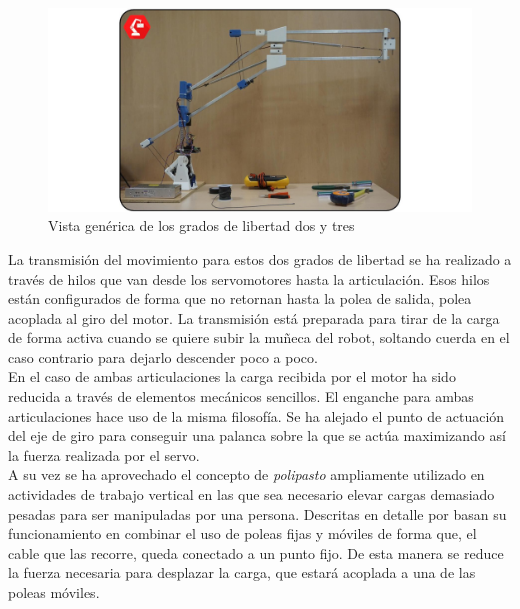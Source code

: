     \begin{figure}[H]
        \centering
        \includegraphics[width=\textwidth]{figuras/Imagenes_Mecanica/foto_brazo_10.jpg}
        \caption{Vista genérica de los grados de libertad dos y tres}
        \label{fig:Mecanica:brazo_con_muelles}
    \end{figure}


    La transmisión del movimiento para estos dos grados de libertad se ha realizado a través de hilos que van desde los servomotores hasta la articulación. Esos hilos están configurados de forma que no retornan hasta la polea de salida, polea acoplada al giro del motor. La transmisión está preparada para tirar de la carga de forma activa cuando se quiere subir la muñeca del robot, soltando cuerda en el caso contrario para dejarlo descender poco a poco.
	\\

    En el caso de ambas articulaciones la carga recibida por el motor ha sido reducida a través de elementos mecánicos sencillos. El enganche para ambas articulaciones hace uso de la misma filosofía. Se ha alejado el punto de actuación del eje de giro para conseguir una palanca sobre la que se actúa maximizando así la fuerza realizada por el servo.
    \\

    A su vez se ha aprovechado el concepto de \textit{polipasto} ampliamente utilizado en actividades de trabajo vertical en las que sea necesario elevar cargas demasiado pesadas para ser manipuladas por una persona. Descritas en detalle por \cite{granvertical} basan su funcionamiento en combinar el uso de poleas fijas y móviles de forma que, el cable que las recorre, queda conectado a un punto fijo. De esta manera se reduce la fuerza necesaria para desplazar la carga, que estará acoplada a una de las poleas móviles.


